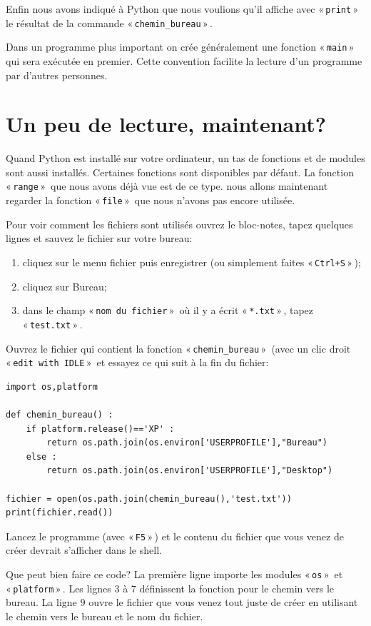 Enfin nous avons indiqué à Python que nous voulions qu'il affiche avec « \texttt{print} »  le résultat de la commande « \texttt{chemin\_bureau} » .

Dans un programme plus important on crée généralement une fonction « \texttt{main} »  qui sera exécutée en premier. Cette convention facilite la lecture d'un programme par d'autres personnes.

\section{Un peu de lecture, maintenant?}
Quand Python est installé sur votre ordinateur, un tas de fonctions et de modules sont aussi installés. Certaines fonctions sont disponibles par défaut. La fonction « \texttt{range} »  que nous avons déjà vue est de ce type. nous allons maintenant regarder la fonction « \texttt{file} »  que nous n'avons pas encore utilisée.

Pour voir comment les fichiers sont utilisés ouvrez le bloc-notes, tapez quelques lignes et sauvez le fichier sur votre bureau:
\begin{enumerate}
\item cliquez sur le menu fichier puis enregistrer (ou simplement faites « \texttt{Ctrl+S} » );
\item cliquez sur Bureau;
\item dans le champ « \texttt{nom du fichier} »  où il y a écrit « \texttt{*.txt} » , tapez « \texttt{test.txt} » .
\end{enumerate}

Ouvrez le fichier qui contient la fonction « \texttt{chemin\_bureau} »  (avec un clic droit « \texttt{edit with IDLE} »  et essayez ce qui suit à la fin du fichier:
\begin{Verbatim}[frame=single,rulecolor=\color{mbleu}, label=à taper]
import os,platform

def chemin_bureau() :
    if platform.release()=='XP' :
        return os.path.join(os.environ['USERPROFILE'],"Bureau")
    else :
        return os.path.join(os.environ['USERPROFILE'],"Desktop")
    
fichier = open(os.path.join(chemin_bureau(),'test.txt'))
print(fichier.read())
\end{Verbatim}

Lancez le programme (avec « \texttt{F5} » ) et le contenu du fichier que vous venez de créer devrait s'afficher dans le shell. 

Que peut bien faire ce code? La première ligne importe les modules « \texttt{os} »   et « \texttt{platform} » . Les lignes 3 à 7 définissent la fonction pour le chemin vers le bureau.
La ligne 9 ouvre le fichier que vous venez tout juste de créer en utilisant le chemin vers le bureau et le nom du fichier.

